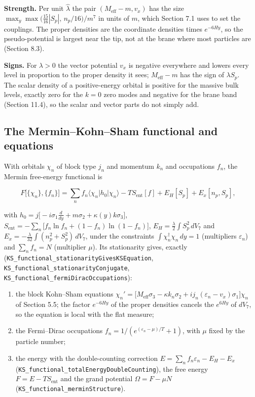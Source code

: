 \documentclass[11pt]{article}
\begin{document}
\textbf{Strength.} Per unit $\hat\lambda$ the pair $(M_{\mathrm{eff}}-m,v_x)$ has the size $\max_y\max\bigl(\tfrac{15}{16}|S_p|,\,n_p/16\bigr)/m^7$ in units of $m$, which Section 7.1 uses to set the couplings. The proper densities are the coordinate densities times $e^{-6Hy}$, so the pseudo-potential is largest near the tip, not at the brane where most particles are (Section 8.3).

\textbf{Signs.} For $\lambda>0$ the vector potential $v_x$ is negative everywhere and lowers every level in proportion to the proper density it sees; $M_{\mathrm{eff}}-m$ has the sign of $\lambda S_p$. The scalar density of a positive-energy orbital is positive for the massive bulk levels, exactly zero for the $k=0$ zero modes and negative for the brane band (Section 11.4), so the scalar and vector parts do not simply add.

\subsection{The Mermin--Kohn--Sham functional and equations}

With orbitals $\chi_n$ of block type $j_n$ and momentum $k_n$ and occupations $f_n$, the Mermin free-energy functional is

\[
F\bigl[\{\chi_n\},\{f_n\}\bigr]=\sum_nf_n\langle\chi_n|h_0|\chi_n\rangle-TS_{\mathrm{ent}}[f]+E_H[S_p]+E_x[n_p,S_p],
\]

with $h_0=j\bigl[-i\sigma_1\tfrac{d}{dy}+m\sigma_2+\kappa(y)k\sigma_3\bigr]$, $S_{\mathrm{ent}}=-\sum_n\bigl[f_n\ln f_n+(1-f_n)\ln(1-f_n)\bigr]$, $E_H=\tfrac\lambda2\int S_p^2\,dV_7$ and $E_x=-\tfrac\lambda{32}\int(n_p^2+S_p^2)\,dV_7$, under the constraints $\int\chi_n^\dagger\chi_n\,dy=1$ (multipliers $\varepsilon_n$) and $\sum_nf_n=N$ (multiplier $\mu$). Its stationarity gives, exactly (\texttt{KS\_funct\allowbreak{}ional\_st\allowbreak{}ationari\allowbreak{}tyGivesK\allowbreak{}SEquatio\allowbreak{}n}, \texttt{KS\_funct\allowbreak{}ional\_st\allowbreak{}ationari\allowbreak{}tyConjug\allowbreak{}ate}, \texttt{KS\_funct\allowbreak{}ional\_fe\allowbreak{}rmiDirac\allowbreak{}Occupati\allowbreak{}ons}):

\begin{enumerate}
\item the block Kohn--Sham equations $\chi_n'=\bigl[M_{\mathrm{eff}}\sigma_3-\kappa k_n\sigma_2+ij_n(\varepsilon_n-v_x)\sigma_1\bigr]\chi_n$ of Section 5.5; the factor $e^{-6Hy}$ of the proper densities cancels the $e^{6Hy}$ of $dV_7$, so the equation is local with the flat measure;
\item the Fermi--Dirac occupations $f_n=1/(e^{(\varepsilon_n-\mu)/T}+1)$, with $\mu$ fixed by the particle number;
\item the energy with the double-counting correction $E=\sum_nf_n\varepsilon_n-E_H-E_x$ (\texttt{KS\_funct\allowbreak{}ional\_to\allowbreak{}talEnerg\allowbreak{}yDoubleC\allowbreak{}ounting}), the free energy $F=E-TS_{\mathrm{ent}}$ and the grand potential $\Omega=F-\mu N$ (\texttt{KS\_funct\allowbreak{}ional\_me\allowbreak{}rminStru\allowbreak{}cture}).
\end{enumerate}
\end{document}

